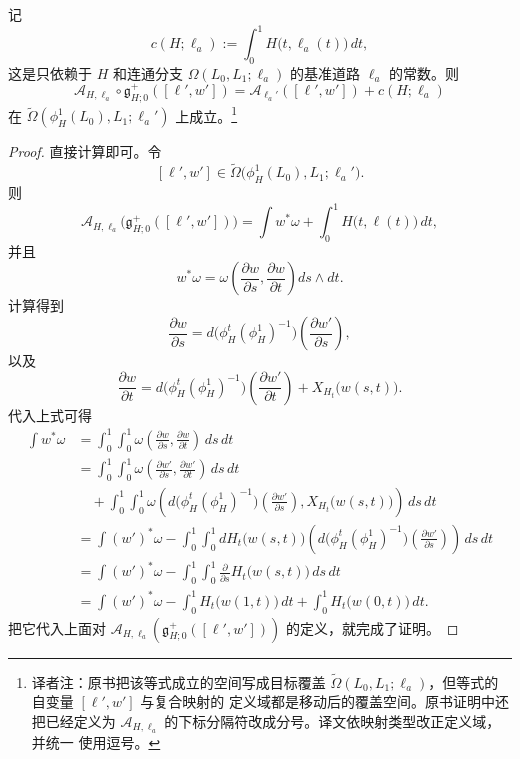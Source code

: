 \begin{lemma}
\label{lem:coordinate-change-action-shift-lzero}
记
\[
  c(H;\ell_a)
  :=
  \int_0^1H\bigl(t,\ell_a(t)\bigr)\,dt,
\]
这是只依赖于 $H$ 和连通分支 $\Omega(L_0,L_1;\ell_a)$ 的基准道路 $\ell_a$
的常数。则
\begin{equation}
  \mathcal A_{H,\ell_a}
  \circ\mathfrak g_{H;0}^+([\ell',w'])
  =
  \mathcal A_{\ell_a'}([\ell',w'])
  +
  c(H;\ell_a)
\label{eq:coordinate-change-action-shift-lzero}
\end{equation}
在
$\widetilde\Omega(\phi_H^1(L_0),L_1;\ell_a')$
上成立。\footnote{译者注：原书把该等式成立的空间写成目标覆盖
$\widetilde\Omega(L_0,L_1;\ell_a)$，但等式的自变量 $[\ell',w']$ 与复合映射的
定义域都是移动后的覆盖空间。原书证明中还把已经定义为
$\mathcal A_{H,\ell_a}$ 的下标分隔符改成分号。译文依映射类型改正定义域，并统一
使用逗号。}
\end{lemma}

\begin{proof}
直接计算即可。令
\[
  [\ell',w']
  \in
  \widetilde\Omega\bigl(\phi_H^1(L_0),L_1;\ell_a'\bigr).
\]
则
\[
  \mathcal A_{H,\ell_a}
  \bigl(\mathfrak g_{H;0}^+([\ell',w'])\bigr)
  =
  \int w^*\omega
  +
  \int_0^1H\bigl(t,\ell(t)\bigr)\,dt,
\]
并且
\[
  w^*\omega
  =
  \omega\left(
    \frac{\partial w}{\partial s},
    \frac{\partial w}{\partial t}
  \right)
  ds\wedge dt.
\]
计算得到
\[
  \frac{\partial w}{\partial s}
  =
  d\bigl(\phi_H^t(\phi_H^1)^{-1}\bigr)
  \left(\frac{\partial w'}{\partial s}\right),
\]
以及
\[
  \frac{\partial w}{\partial t}
  =
  d\bigl(\phi_H^t(\phi_H^1)^{-1}\bigr)
  \left(\frac{\partial w'}{\partial t}\right)
  +
  X_{H_t}\bigl(w(s,t)\bigr).
\]
代入上式可得
\begin{align*}
  \int w^*\omega
  &=
  \int_0^1\int_0^1
  \omega\left(
    \frac{\partial w}{\partial s},
    \frac{\partial w}{\partial t}
  \right)\,ds\,dt\\
  &=
  \int_0^1\int_0^1
  \omega\left(
    \frac{\partial w'}{\partial s},
    \frac{\partial w'}{\partial t}
  \right)\,ds\,dt\\
  &\quad+
  \int_0^1\int_0^1
  \omega\left(
    d\bigl(\phi_H^t(\phi_H^1)^{-1}\bigr)
    \left(\frac{\partial w'}{\partial s}\right),
    X_{H_t}\bigl(w(s,t)\bigr)
  \right)\,ds\,dt\\
  &=
  \int(w')^*\omega
  -
  \int_0^1\int_0^1
  dH_t\bigl(w(s,t)\bigr)
  \left(
    d\bigl(\phi_H^t(\phi_H^1)^{-1}\bigr)
    \left(\frac{\partial w'}{\partial s}\right)
  \right)\,ds\,dt\\
  &=
  \int(w')^*\omega
  -
  \int_0^1\int_0^1
  \frac{\partial}{\partial s}
  H_t\bigl(w(s,t)\bigr)\,ds\,dt\\
  &=
  \int(w')^*\omega
  -
  \int_0^1H_t\bigl(w(1,t)\bigr)\,dt
  +
  \int_0^1H_t\bigl(w(0,t)\bigr)\,dt.
\end{align*}
把它代入上面对
$\mathcal A_{H,\ell_a}(\mathfrak g_{H;0}^+([\ell',w']))$
的定义，就完成了证明。
\end{proof}

